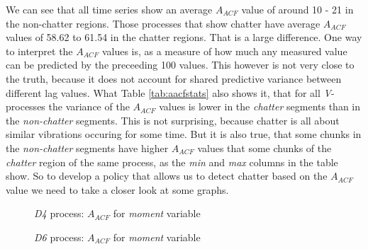 \documentclass[12 pt]{scrartcl}
\begin{document}
We can see that all time series show an average $A_{ACF}$ value of around 10 - 21 in the non-chatter regions. Those processes that show chatter have average $A_{ACF}$ values of 58.62 to 61.54 in the chatter regions. That is a large difference. One way to interpret the $A_{ACF}$ values is, as a measure of how much any measured value can be predicted by the preceeding 100 values. This however is not very close to the truth, because it does not account for shared predictive variance between different lag values. What Table \ref{tab:aacfstats} also shows it, that for all \emph{V}-processes the variance of the $A_{ACF}$ values is lower in the \emph{chatter} segments than in the \emph{non-chatter} segments. This is not surprising, because chatter is all about similar vibrations occuring for some time.
But it is also true, that some chunks in the \emph{non-chatter} segments have higher $A_{ACF}$ values that some chunks of the \emph{chatter} region of the same process, as the \emph{min} and \emph{max} columns in the table show. So to develop a policy that allows us to detect chatter based on the $A_{ACF}$ value we need to take a closer look at some graphs.

\begin{figure}[p]
  \caption{\emph{D4} process: $A_{ACF}$ for \emph{moment} variable}
  \label{fig:d4-moment-aacf}
\end{figure}


\begin{figure}[p]
  \caption{\emph{D6} process: $A_{ACF}$ for \emph{moment} variable}
  \label{fig:d6-moment-aacf}
\end{figure}
\end{document}
